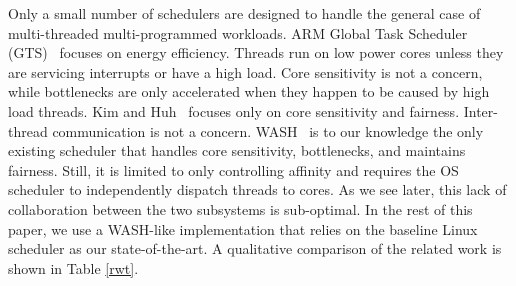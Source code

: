 Only a small number of schedulers are designed to handle the general case of multi-threaded multi-programmed workloads. ARM Global Task Scheduler (GTS)~\cite{jeff2013big} focuses on energy efficiency. Threads run on low power cores unless they are servicing interrupts or have a high load. Core sensitivity is not a concern, while bottlenecks are only accelerated when they happen to be caused by high load threads. Kim and Huh~\cite{kim2018exploring} focuses only on core sensitivity and fairness. Inter-thread communication is not a concern. WASH~\cite{jibaja2016portable} is to our knowledge the only existing scheduler that handles core sensitivity, bottlenecks, and maintains fairness. Still, it is limited to only controlling affinity and requires the OS scheduler to independently dispatch threads to cores. As we see later, this lack of collaboration between the two subsystems is sub-optimal. In the rest of this paper, we use a WASH-like implementation that relies on the baseline Linux scheduler as our state-of-the-art. A qualitative comparison of the related work is shown in Table \ref{rwt}.